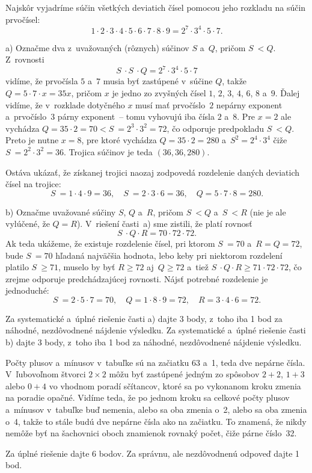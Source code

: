 {%
Najskôr vyjadríme súčin všetkých deviatich čísel pomocou jeho rozkladu na súčin prvočísel:
$$
1 \cdot 2 \cdot 3 \cdot 4 \cdot 5 \cdot 6 \cdot 7 \cdot 8 \cdot 9 = 2^7
\cdot 3^4 \cdot 5 \cdot 7.
$$

\smallskip
a) Označme dva z~uvažovaných (rôznych) súčinov $S$ a~$Q$, pričom $S~< Q$. Z~rovnosti
$$
S~\cdot S~\cdot Q = 2^7 \cdot 3^4 \cdot 5 \cdot 7
$$
vidíme, že prvočísla $5$ a~$7$ musia byť zastúpené v~súčine $Q$,
takže $Q = {5 \cdot 7 \cdot x} = 35x$, pričom $x$ je jedno zo zvyšných
čísel $1$, $2$, $3$, $4$, $6$, $8$ a~$9$. Ďalej vidíme, že v~rozklade dotyčného $x$
musí mať prvočíslo~$2$ nepárny exponent a~prvočíslo~$3$ párny exponent~--
tomu vyhovujú iba čísla $2$ a~$8$. Pre $x = 2$ ale vychádza $Q = 35\cdot2
= 70<S~= {2^3 \cdot 3^2} = 72$, čo odporuje predpokladu $S~< Q$. Preto
je nutne $x = 8$, pre ktoré vychádza $Q = 35\cdot2 = 280$ a~$S^2 = 2^4
\cdot 3^4$ čiže $S~= 2^2 \cdot 3^2 = 36$. Trojica súčinov je teda
$(36, 36, 280)$.

Ostáva ukázať, že získanej trojici naozaj zodpovedá rozdelenie daných
deviatich čísel na trojice:
$$
S~= 1 \cdot 4 \cdot 9 = 36,\quad S~= 2 \cdot 3 \cdot 6 = 36,\quad
Q = 5 \cdot 7 \cdot 8 = 280.
$$

\smallskip
b) Označme uvažované súčiny $S$, $Q$ a~$R$, pričom $S~< Q$ a~$S~< R$ (nie je ale
vylúčené, že $Q = R$). V~riešení časti~a) sme zistili, že platí rovnosť
$$
S~\cdot Q \cdot R = 70 \cdot 72 \cdot 72.
$$
Ak teda ukážeme, že existuje rozdelenie čísel, pri ktorom $S~= 70$ a~$R = Q= 72$,
bude $S~= 70$ hľadaná najväčšia hodnota, lebo keby pri niektorom rozdelení
platilo $S~\geq 71$, muselo by byť $R \geq 72$ aj~$Q \geq 72$ a~tiež
$S~\cdot Q \cdot R \geq 71 \cdot 72 \cdot 72$,
čo zrejme odporuje predchádzajúcej rovnosti. Nájsť potrebné rozdelenie je jednoduché:
$$
S~= 2 \cdot 5 \cdot 7 = 70,\quad Q = 1 \cdot 8 \cdot 9 = 72,\quad
R = 3 \cdot4 \cdot 6 = 72.
$$



\nobreak\medskip\petit\noindent
Za systematické a~úplné riešenie časti a) dajte 3 body, z~toho iba 1
bod za náhodné, nezdôvodnené nájdenie výsledku. Za systematické
a~úplné riešenie časti b) dajte 3 body, z~toho iba 1 bod za náhodné,
nezdôvodnené nájdenie výsledku.
\endpetit
\bigbreak
}

{%
Počty plusov a~mínusov v~tabuľke sú na začiatku 63 a~1, teda dve nepárne
čísla. V~ľubovoľnom štvorci $2\times2$ môžu byť zastúpené jedným zo spôsobov
$2+2$, $1+3$ alebo $0+4$ vo vhodnom poradí sčítancov, ktoré sa po vykonanom
kroku zmenia na poradie opačné. Vidíme teda, že po jednom kroku sa celkové počty
plusov a~mínusov v~tabuľke buď nemenia, alebo sa oba zmenia o~2, alebo sa oba
zmenia o~4, takže to stále budú dve nepárne čísla ako na začiatku. To znamená,
že nikdy nemôže byť na šachovnici oboch znamienok rovnaký počet, čiže
párne číslo~32.



\nobreak\medskip\petit\noindent
Za úplné riešenie dajte 6 bodov.
Za správnu, ale nezdôvodnenú odpoveď dajte 1 bod.
\endpetit
\bigbreak
}

